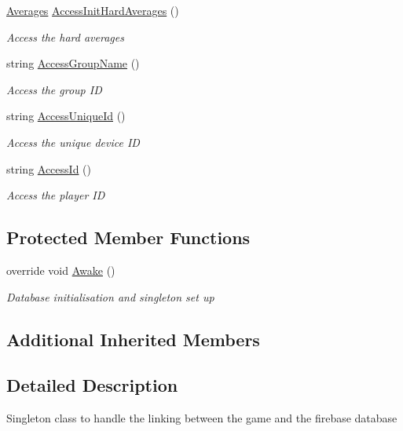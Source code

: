 \begin{DoxyCompactItemize}
\mbox{\hyperlink{struct_level_generation_1_1_averages}{Averages}} \mbox{\hyperlink{class_database_manager_a61d0614a2d858005a6c3abac1283c8f2}{Access\+Init\+Hard\+Averages}} ()
\begin{DoxyCompactList}\small\item\em Access the hard averages \end{DoxyCompactList}\item 
string \mbox{\hyperlink{class_database_manager_a3ecc1e7d30ba7c71922588dd7a03c8cb}{Access\+Group\+Name}} ()
\begin{DoxyCompactList}\small\item\em Access the group ID \end{DoxyCompactList}\item 
string \mbox{\hyperlink{class_database_manager_a78fbe5d16d91f8a9da73c348518af5fb}{Access\+Unique\+Id}} ()
\begin{DoxyCompactList}\small\item\em Access the unique device ID \end{DoxyCompactList}\item 
string \mbox{\hyperlink{class_database_manager_a59fd27d4114804a39d197da3b95fa2de}{Access\+Id}} ()
\begin{DoxyCompactList}\small\item\em Access the player ID \end{DoxyCompactList}\end{DoxyCompactItemize}
\subsection*{Protected Member Functions}
\begin{DoxyCompactItemize}
\item 
override void \mbox{\hyperlink{class_database_manager_ab6b2a5348b157b217b1ee38a468a3167}{Awake}} ()
\begin{DoxyCompactList}\small\item\em Database initialisation and singleton set up \end{DoxyCompactList}\end{DoxyCompactItemize}
\subsection*{Additional Inherited Members}


\subsection{Detailed Description}
Singleton class to handle the linking between the game and the firebase database 



